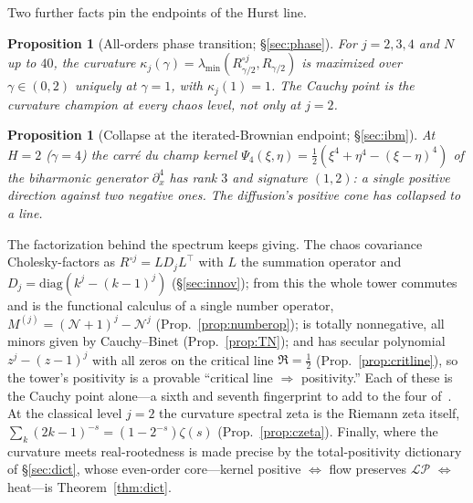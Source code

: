 \documentclass[11pt,reqno]{amsart}
\theoremstyle{plain}
\newtheorem{proposition}[theorem]{Proposition}
\theoremstyle{definition}
\theoremstyle{remark}
\newcommand{\LP}{\mathcal{LP}}
\newcommand{\Had}{\circ}
\begin{document}
Two further facts pin the endpoints of the Hurst line.

\begin{proposition}[All-orders phase transition; \S\ref{sec:phase}]
\label{prop:intro-phase}
For $j=2,3,4$ and $N$ up to $40$, the curvature
$\kappa_j(\gamma)=\lambda_{\min}(R_{\gamma/2}^{\Had j},R_{\gamma/2})$ is
maximized over $\gamma\in(0,2)$ uniquely at $\gamma=1$, with
$\kappa_j(1)=1$. The Cauchy point is the curvature champion at every
chaos level, not only at $j=2$.
\end{proposition}

\begin{proposition}[Collapse at the iterated-Brownian endpoint;
\S\ref{sec:ibm}]\label{prop:intro-ibm}
At $H=2$ ($\gamma=4$) the carr\'e du champ kernel
$\Psi_4(\xi,\eta)=\tfrac12(\xi^4+\eta^4-(\xi-\eta)^4)$ of the biharmonic
generator $\partial_x^4$ has rank $3$ and signature $(1,2)$: a single
positive direction against two negative ones. The diffusion's positive
cone has collapsed to a line.
\end{proposition}

The factorization behind the spectrum keeps giving. The chaos covariance
Cholesky-factors as $R^{\Had j}=LD_jL^{\top}$ with $L$ the summation
operator and $D_j=\mathrm{diag}(k^j-(k-1)^j)$ (\S\ref{sec:innov}); from
this the whole tower commutes and is the functional calculus of a single
number operator, $M^{(j)}=(\mathcal N+1)^j-\mathcal N^j$
(Prop.~\ref{prop:numberop}); is totally nonnegative, all minors given by
Cauchy--Binet (Prop.~\ref{prop:TN}); and has secular polynomial
$z^j-(z-1)^j$ with all zeros on the critical line $\Re=\tfrac12$
(Prop.~\ref{prop:critline}), so the tower's positivity is a provable
``critical line $\Rightarrow$ positivity.'' Each of these is the Cauchy
point alone---a sixth and seventh fingerprint to add to the four
of~\cite{FontesBE}. At the classical level $j=2$ the curvature spectral
zeta is the Riemann zeta itself, $\sum_k(2k-1)^{-s}=(1-2^{-s})\zeta(s)$
(Prop.~\ref{prop:czeta}). Finally, where the curvature meets
real-rootedness is made precise by the total-positivity dictionary of
\S\ref{sec:dict}, whose even-order core---kernel positive
$\Leftrightarrow$ flow preserves $\LP$ $\Leftrightarrow$ heat---is
Theorem~\ref{thm:dict}.
\end{document}
